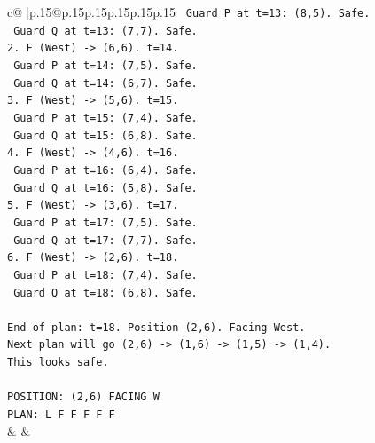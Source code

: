 \documentclass{article}
\begin{document}
{\begin{supertabular}{c@{$\;$}|p{.15\linewidth}@{}p{.15\linewidth}p{.15\linewidth}p{.15\linewidth}p{.15\linewidth}p{.15\linewidth}}
{{{\texttt{   Guard P at t=13: (8,5). Safe.} \\
\texttt{   Guard Q at t=13: (7,7). Safe.} \\
\texttt{2. F (West) {-}> (6,6). t=14.} \\
\texttt{   Guard P at t=14: (7,5). Safe.} \\
\texttt{   Guard Q at t=14: (6,7). Safe.} \\
\texttt{3. F (West) {-}> (5,6). t=15.} \\
\texttt{   Guard P at t=15: (7,4). Safe.} \\
\texttt{   Guard Q at t=15: (6,8). Safe.} \\
\texttt{4. F (West) {-}> (4,6). t=16.} \\
\texttt{   Guard P at t=16: (6,4). Safe.} \\
\texttt{   Guard Q at t=16: (5,8). Safe.} \\
\texttt{5. F (West) {-}> (3,6). t=17.} \\
\texttt{   Guard P at t=17: (7,5). Safe.} \\
\texttt{   Guard Q at t=17: (7,7). Safe.} \\
\texttt{6. F (West) {-}> (2,6). t=18.} \\
\texttt{   Guard P at t=18: (7,4). Safe.} \\
\texttt{   Guard Q at t=18: (6,8). Safe.} \\
\\ 
\texttt{End of plan: t=18. Position (2,6). Facing West.} \\
\texttt{Next plan will go (2,6) {-}> (1,6) {-}> (1,5) {-}> (1,4).} \\
\texttt{This looks safe.} \\
\\ 
\texttt{POSITION: (2,6) FACING W} \\
\texttt{PLAN: L F F F F F} \\
            }
        }
    }
    & & \\ \\


\end{supertabular}}
\end{document}
